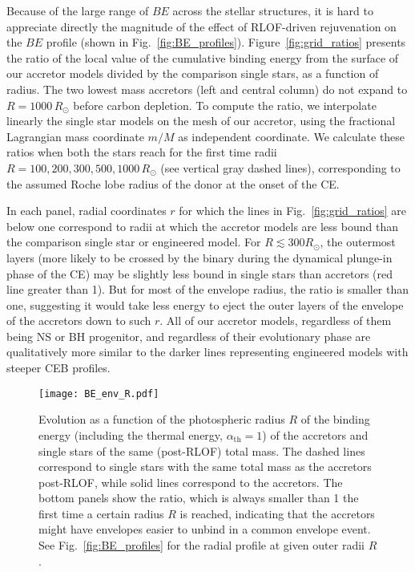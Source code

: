\documentclass[twocolumn,twocolappendix,trackchanges]{aastex63}
\DeclareRobustCommand{\Figref}[1]{Fig.~\ref{#1}}
\begin{document}
Because of the large range of $BE$ across the stellar structures, it
is hard to appreciate directly the magnitude of the effect of RLOF-driven
rejuvenation on the $BE$ profile (shown in \Figref{fig:BE_profiles}). Figure~\ref{fig:grid_ratios} presents the
ratio of the local value of the cumulative binding energy from the
surface of our accretor models divided by the
comparison single stars, as a function of radius. The two
lowest mass accretors (left and central column) do not expand to
$R=1000\, R_\odot$ before carbon depletion. To compute the
ratio, we interpolate linearly the single star models on the mesh of
our accretor, using the fractional Lagrangian mass coordinate $m/M$ as
independent coordinate. %
We calculate these ratios
when both the stars reach for the first time radii
$R=100, 200, 300, 500, 1000\,R_\odot$ (see vertical gray dashed
lines), corresponding to the assumed Roche lobe radius of the donor at
the onset of the CE.

In each panel, radial coordinates $r$ for which the lines in
\Figref{fig:grid_ratios} are below one correspond to radii at which
the accretor models are less bound than the comparison single star or
engineered model. For $R\lesssim 300R_\odot$, the outermost layers
(more likely to be crossed by the binary during the dynamical
plunge-in phase of the CE) may be slightly less bound in single stars
than accretors (red line greater than 1). But for most of the envelope
radius, the ratio is smaller than one, suggesting it would take less
energy to eject the outer layers of the envelope of the accretors down
to such $r$. All of our accretor models, regardless of them being NS
or BH progenitor, and regardless of their evolutionary phase %
are qualitatively more similar to the darker lines
representing engineered models with steeper CEB profiles.


\begin{figure}[htbp]
  \centering
  \texttt{[image: BE\_env\_R.pdf]}
  \caption{Evolution as a function of the photospheric radius $R$ of
    the binding energy (including the thermal energy,
    $\alpha_\mathrm{th}=1$) of the accretors and single stars of the
    same (post-RLOF) total mass. The dashed lines correspond to single
    stars with the same total mass as the accretors post-RLOF, while
    solid lines correspond to the accretors. The bottom panels show
    the ratio, which is always smaller than 1 the first time a certain
    radius $R$ is reached, indicating that the accretors might have
    envelopes easier to unbind in a common envelope event. See
    \Figref{fig:BE_profiles} for the radial profile at given outer
    radii $R$.}
  \label{fig:BE_env_R}
\end{figure}
\end{document}
